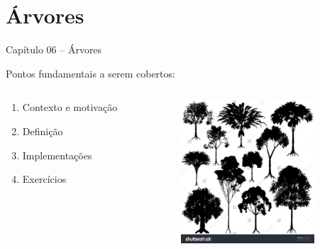 \section{Árvores}

\begin{frame}

\begin{center}
{\Large Capítulo 06 -- Árvores}
\end{center}

Pontos fundamentais a serem cobertos:
\begin{columns}
\begin{column}{.3\textwidth}
\centering

  \begin{enumerate}
  \item Contexto e motivação

  \item Definição

  \item Implementações

  \item Exercícios 

\end{enumerate}  

\end{column}
\begin{column}{.7\textwidth}
\centering
\includegraphics[height=5.3cm, width=7cm]{figs/fig_arvores/arv_CAPA.jpg}
\hspace{+0.25cm}
\end{column}
\end{columns}


\end{frame}
